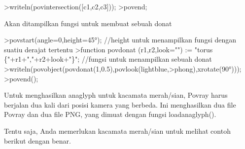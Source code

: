 \documentclass[a4paper,10pt]{article}
\begin{document}
\begin{eulernotebook}
\begin{euleroutput}
\end{euleroutput}
\begin{eulerprompt}
>writeln(povintersection([c1,c2,c3]));
>povend;
\end{eulerprompt}
\begin{eulercomment}
Akan ditampilkan fungsi untuk membuat sebuah donat
\end{eulercomment}
\begin{eulerprompt}
>povstart(angle=0,height=45°); //height untuk menampilkan fungsi dengan suatiu derajat tertentu 
>function povdonat (r1,r2,look="") := "torus \{"+r1+","+r2+look+"\}"; //fungsi untuk menampilkan sebuah donat
>writeln(povobject(povdonat(1,0.5),povlook(lightblue,>phong),xrotate(90°)));
>povend();
\end{eulerprompt}
\begin{eulercomment}
Untuk menghasilkan anaglyph untuk kacamata merah/sian, Povray harus
berjalan dua kali dari posisi kamera yang berbeda. Ini menghasilkan
dua file Povray dan dua file PNG, yang dimuat dengan fungsi
loadanaglyph().

Tentu saja, Anda memerlukan kacamata merah/sian untuk melihat contoh
berikut dengan benar.


\end{eulercomment}
\end{eulernotebook}
\end{document}
